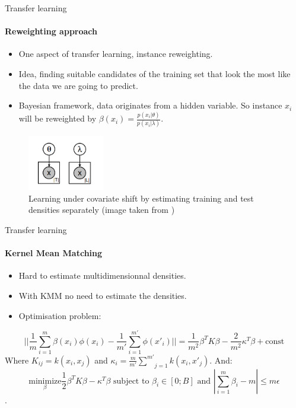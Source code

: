 \documentclass{beamer}
\begin{document}
\begin{frame}{Transfer learning}
\framesubtitle{Reweighting approach}

\begin{itemize}
\item One aspect of transfer learning, instance reweighting.
\item Idea, finding suitable candidates of the training set that look the most like the data we are going to predict.
\item Bayesian framework, data originates from a hidden variable. So instance $x_i$ will be reweighted by $\beta(x_i)=\frac{p(x_i|\theta)}{p(x_i|\lambda)}$.
\end{itemize}
\begin{figure}[!ht]
\centering
\includegraphics[width=0.3\textwidth]{Images/Method1.png}
\caption{Learning under covariate shift by estimating training
and test densities separately (image taken from \cite{pict})}
\label{fig: Method1}
\end{figure}


\end{frame}

\begin{frame}{Transfer learning}
\framesubtitle{Kernel Mean Matching}
\begin{itemize}
\item Hard to estimate multidimensionnal densities.
\item With KMM no need to estimate the densities.
\item Optimisation problem:
\end{itemize}
$$||\frac{1}{m}\underset{i=1}{\overset{m}{\sum}}\beta(x_i)\phi(x_i) - \frac{1}{m'}\underset{i=1}{\overset{m'}{\sum}}\phi(x'_i)|| = \frac{1}{m^2}\beta^T K \beta - \frac{2}{m^2} \kappa^T\beta + \text{const} $$
Where $K_{ij}=k(x_i,x_j)$ and $\kappa_i=\frac{m}{m'}\underset{j=1}{\overset{m'}{\sum}}k(x_i,x'_j)$. And: 
$$\underset{\beta}{\text{minimize}} \frac{1}{2}\beta^TK\beta-\kappa^T\beta \text{\ subject \ to } \beta_i \in [0;B] \text{\ and \ } |\underset{i=1}{\overset{m}{\sum}}\beta_i-m | \leq m\epsilon$$.

\end{frame}
\end{document}
